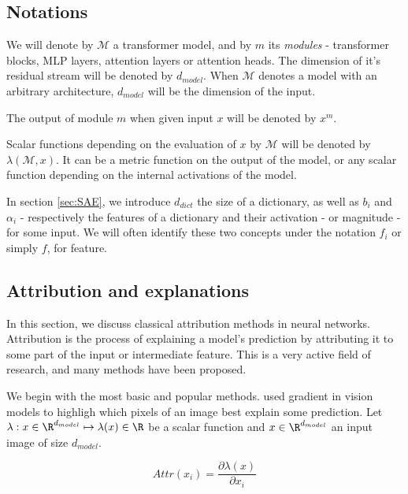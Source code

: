 \documentclass{article}
\begin{document}



\subsection{Notations}

We will denote by $\mathcal{M}$ a transformer model, and by $m$ its \textit{modules} - transformer blocks, MLP layers, attention layers or attention heads. The dimension of it's residual stream will be denoted by $d_{model}$. When $\mathcal{M}$ denotes a model with an arbitrary architecture, $d_{model}$ will be the dimension of the input.

The output of module $m$ when given input $x$ will be denoted by $x^m$.

Scalar functions depending on the evaluation of $x$ by $\mathcal{M}$ will be denoted by $\lambda(\mathcal{M}, x)$. It can be a metric function on the output of the model, or any scalar function depending on the internal activations of the model.

In section \ref{sec:SAE}, we introduce $d_{dict}$ the size of a dictionary, as well as $b_i$ and $\alpha_i$ - respectively the features of a dictionary and their activation - or magnitude - for some input. We will often identify these two concepts under the notation $f_i$ or simply $f$, for feature.

\subsection{Attribution and explanations}

In this section, we discuss  classical attribution methods in neural networks. Attribution is the process of explaining a model's prediction by attributing it to some part of the input or intermediate feature. This is a very active field of research, and many methods have been proposed.

We begin with the most basic and popular methods. \citet{springenberg2015strivingGuidedBackprop} used gradient in vision models to highligh which pixels of an image best explain some prediction. Let $\lambda : x \in \R^{d_{model}} \mapsto \lambda(x) \in \R$ be a scalar function and $x \in \R^{d_{model}}$ an input image of size $d_{model}$.

$$ Attr(x_i) = \frac{\partial \lambda(x)}{\partial x_i} $$
\end{document}
